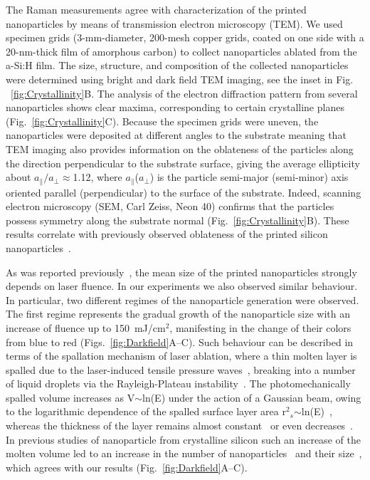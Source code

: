                 The Raman measurements agree with characterization of the printed nanoparticles by means of transmission electron
            microscopy (TEM). We used specimen grids (3-mm-diameter, 200-mesh copper grids, coated on one side with a 20-nm-thick
            film of amorphous carbon) to collect nanoparticles ablated from the a-Si:H film. The size, structure, and composition
            of the collected nanoparticles were determined using bright and dark field TEM imaging, see the inset in Fig.
            ~\ref{fig:Crystallinity}B. The analysis of the electron diffraction pattern from several nanoparticles shows clear maxima,
            corresponding to certain crystalline planes (Fig.~\ref{fig:Crystallinity}C). Because the specimen grids were uneven, the
            nanoparticles were deposited at different angles to the substrate meaning that TEM imaging also provides information
            on the oblateness of the particles along the direction perpendicular to the substrate surface, giving the average
            ellipticity about $a_{\parallel}/a_{\perp}\approx$1.12, where $a_{\parallel}$($a_{\perp}$) is the particle semi-major
            (semi-minor) axis oriented parallel (perpendicular) to the surface of the substrate. Indeed, scanning electron
            microscopy (SEM, Carl Zeiss, Neon 40) confirms that the particles possess  symmetry along the substrate
            normal (Fig.~\ref{fig:Crystallinity}B). These results correlate with previously observed oblateness of the printed silicon
            nanoparticles~\cite{zywietz2014laser}.

                As was reported previously~\cite{zywietz2014laser, zywietz2014generation}, the mean size of the printed nanoparticles
            strongly depends on laser fluence. In our experiments we also observed similar behaviour. In particular, two different
            regimes of the nanoparticle generation were observed. The first regime represents the gradual growth of the nanoparticle
            size with an increase of fluence up to 150~mJ/cm$^{2}$, manifesting in the change of their colors from blue to red
            (Figs.~\ref{fig:Darkfield}A--C). Such behaviour can be described in terms of the spallation mechanism of laser ablation, where
            a thin molten layer is spalled due to the laser-induced tensile pressure waves~\cite{ionin2013thermal,wu2014microscopic},
            breaking into a number of liquid droplets via the Rayleigh-Plateau instability~\cite{papageorgiou1995breakup}.
            The photomechanically spalled volume increases as V$\sim$ln(E) under the action of a Gaussian beam, owing to the
            logarithmic dependence of the spalled surface layer area r$^{2}$$_{s}$$\sim$ln(E)~\cite{bauerle2013laser}, whereas
            the thickness of the layer remains almost constant~\cite{ionin2013thermal} or even decreases~\cite{wu2014microscopic}.
            In previous studies of nanoparticle  from crystalline silicon such an increase of the molten volume led
            to an increase in the number of nanoparticles~\cite{zywietz2014generation} and their size~\cite{zywietz2014laser},
            which agrees with our results (Fig.~\ref{fig:Darkfield}A--C).

